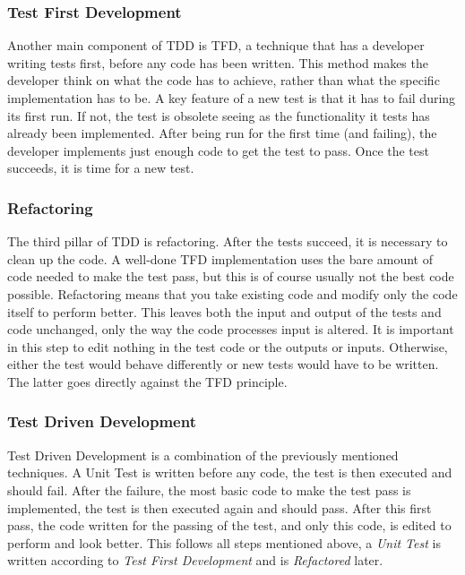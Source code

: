 \documentclass[11pt,british]{article}
\begin{document}
\subsubsection{Test First Development}
Another main component of \gls{TDD} is \gls{TFD}, a technique that has a developer writing tests first, before any code has been written. This method makes the developer think on what the code has to achieve, rather than what the specific implementation has to be. A key feature of a new test is that it has to fail during its first run. If not, the test is obsolete seeing as the functionality it tests has already been implemented. After being run for the first time (and failing), the developer implements just enough code to get the test to pass. Once the test succeeds, it is time for a new test.

\subsubsection{Refactoring}
The third pillar of TDD is refactoring. After the tests succeed, it is necessary to clean up the code. A well-done \gls{TFD} implementation uses the bare amount of code needed to make the test pass, but this is of course usually not the best code possible. Refactoring means that you take existing code and modify only the code itself to perform better. This leaves both the input and output of the tests and code unchanged, only the way the code processes input is altered. It is important in this step to edit nothing in the test code or the outputs or inputs. Otherwise, either the test would behave differently or new tests would have to be written. The latter goes directly against the \gls{TFD} principle.

\subsubsection{Test Driven Development}
Test Driven Development is a combination of the previously mentioned techniques. A Unit Test is written before any code, the test is then executed and should fail. After the failure, the most basic code to make the test pass is implemented, the test is then executed again and should pass. After this first pass, the code written for the passing of the test, and only this code, is edited to perform and look better. This follows all steps mentioned above, a \emph{Unit Test} is written according to \emph{Test First Development} and is \emph{Refactored} later.
\end{document}
